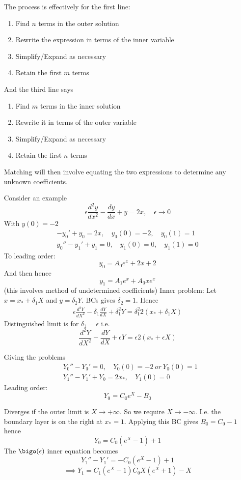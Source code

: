 \documentclass{X:/Documents/Coding/Latex/myassignment}
\begin{document}
The process is effectively for the first line:
\begin{enumerate}
    \item Find $n$ terms in the outer solution
    \item Rewrite the expression in terms of the inner variable
    \item Simplify/Expand as necessary
    \item Retain the first $m$ terms 
\end{enumerate}
And the third line says
\begin{enumerate}
    \item Find $m$ terms in the inner solution
    \item Rewrite it in terms of the outer variable
    \item Simplify/Expand as necessary
    \item Retain the first $n$ terms 
\end{enumerate}
Matching will then involve equating the two expressions to determine any unknown coefficients.

Consider an example
\[\epsilon \frac{d^2y}{dx^2} - \frac{dy}{dx} + y = 2x,\quad \epsilon\to 0\]
With $y(0)= -2$
\begin{align*}
    -y_0' + y_0 = 2x, \quad y_0(0) = -2,\quad y_0(1) = 1\\
    y_0'' - y_1' + y_1 = 0,\quad y_1(0) = 0,\quad y_1(1)=0
\end{align*}
To leading order:
\[y_0 = A_0e^x + 2x +2\]
And then hence
\[y_1 = A_1e^{x} + A_0x e^x\]
(this involves method of undetermined coefficients)
Inner problem:
Let $x  = x_* + \delta_1 X$ and $y = \delta_2 Y$. BCs gives $\delta_2 =1$.
Hence
\begin{align*}
    \epsilon \frac{d^2Y}{dX^2} - \delta_1 \frac{dY}{dX} + \delta_1^2 Y = \delta_1^2 2(x_* + \delta_1 X)
\end{align*}
Distinguished limit is for $\delta_1 = \epsilon$ i.e.
\[\frac{d^2 Y}{dX^2} - \frac{dY}{dX} + \epsilon Y = \epsilon 2(x_* + \epsilon X)\]


Giving the problems
\begin{align*}
    &Y_0'' - Y_0' = 0,\quad Y_0(0)=-2 \ or \ Y_0(0)=1\\
    &Y_1 '' - Y_1' + Y_0 = 2x_*,\quad Y_1(0)=0
\end{align*}
Leading order:
\[Y_0 = C_0e^X - B_0\]

Diverges if the outer limit is $X\to +\infty$. So we require $X\to -\infty$. I.e. the boundary layer is on the right at $x_* = 1$. Applying this BC gives $B_0 = C_0 -1$ hence
\[Y_0 = C_0(e^X -1) +1\]
The $\bigo (\epsilon)$ inner equation becomes
\[Y_1'' - Y_1' = -C_0 (e^X -1 )+1\]
\[\implies Y_1 = C_1(e^X -1) C_0 X(e^X + 1)-X\]
\end{document}
